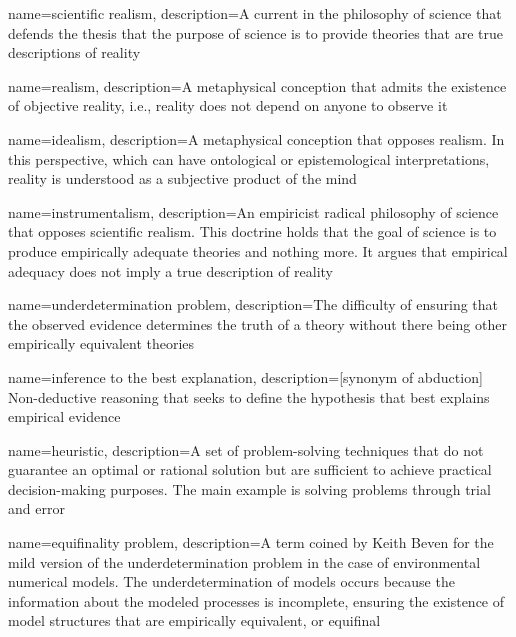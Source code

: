 {
    name=scientific realism,
    description={A current in the philosophy of science that defends the thesis that the purpose of science is to provide theories that are true descriptions of reality}
}

{
    name=realism,
    description={A metaphysical conception that admits the existence of objective reality, i.e., reality does not depend on anyone to observe it}
}

{
    name=idealism,
    description={A metaphysical conception that opposes realism. In this perspective, which can have ontological or epistemological interpretations, reality is understood as a subjective product of the mind}
}

{
    name=instrumentalism,
    description={An empiricist radical philosophy of science that opposes scientific realism. This doctrine holds that the goal of science is to produce empirically adequate theories and nothing more. It argues that empirical adequacy does not imply a true description of reality}
}

{
    name=underdetermination problem,
    description={The difficulty of ensuring that the observed evidence determines the truth of a theory without there being other empirically equivalent theories}
}

{
    name=inference to the best explanation,
    description={[synonym of abduction] Non-deductive reasoning that seeks to define the hypothesis that best explains empirical evidence}
}

{
    name=heuristic,
    description={A set of problem-solving techniques that do not guarantee an optimal or rational solution but are sufficient to achieve practical decision-making purposes. The main example is solving problems through trial and error}
}

{
    name=equifinality problem,
    description={A term coined by Keith Beven for the mild version of the underdetermination problem in the case of environmental numerical models. The underdetermination of models occurs because the information about the modeled processes is incomplete, ensuring the existence of model structures that are empirically equivalent, or equifinal}
}

